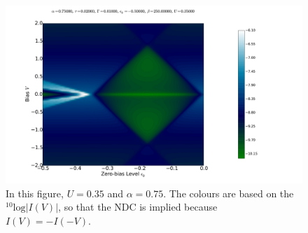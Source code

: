 \begin{figure}[h]
    \centering
    \includegraphics[height=.38\textheight]{pdf/coulombd/current_map_diamond_alpha_075.pdf}
    \caption{In this figure, $U=0.35$ and $\alpha=0.75$. The colours are based on the $^{10}\text{log}\left|I(V)\right|$, so that the NDC is implied because $I(V) = -I(-V)$.}
    \label{fig:diamond75}
\end{figure}

